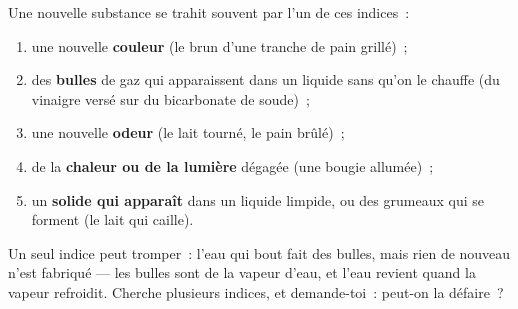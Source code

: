 \begin{method}\label{met:g5:irreversible-changes:clues}
Une nouvelle substance se trahit souvent par l'un de ces indices~:
\begin{enumerate}
  \item une nouvelle \textbf{couleur} (le brun d'une tranche de pain
        grillé)~;
  \item des \textbf{bulles} de gaz qui apparaissent dans un liquide sans
        qu'on le chauffe (du vinaigre versé sur du bicarbonate de
        soude)~;
  \item une nouvelle \textbf{odeur} (le lait tourné, le pain brûlé)~;
  \item de la \textbf{chaleur ou de la lumière} dégagée (une bougie
        allumée)~;
  \item un \textbf{solide qui apparaît} dans un liquide limpide, ou des
        grumeaux qui se forment (le lait qui caille).
\end{enumerate}
Un seul indice peut tromper~: l'eau qui bout fait des bulles, mais rien
de nouveau n'est fabriqué --- les bulles sont de la vapeur d'eau, et
l'eau revient quand la vapeur refroidit. Cherche plusieurs indices, et
demande-toi~: peut-on la défaire~?
\end{method}

